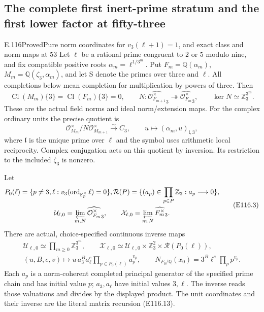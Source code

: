 \subsection{The complete first inert-prime stratum and the first lower factor at fifty-three}

\begin{statement}{E.116}{Proved}{Pure norm coordinates for $v_3(\ell+1)=1$, and exact class and norm maps at $53$}
Let $\ell$ be a rational prime congruent to $2$ or $5$ modulo nine,
and fix compatible positive roots $\alpha_m=\ell^{1/3^m}$.
Put $F_m=\mathbb Q(\alpha_m)$, $M_m=\mathbb Q(\zeta_3,\alpha_m)$,
and let S denote the primes over three and $\ell$.
All completions below mean completion for multiplication by powers of three.
Then
\[
 \operatorname{Cl}(M_m)\{3\}=\operatorname{Cl}(F_m)\{3\}=0,
 \qquad
 N:\widehat{\mathcal O_{F_{m+1}}^\times}_3
       \twoheadrightarrow\widehat{\mathcal O_{F_m}^\times}_3,
 \qquad \ker N\simeq\mathbb Z_3^{3^m}.
 \tag{E116.1}
\]
These are the actual field norms and ideal norm/extension maps.
For the complex ordinary units the precise quotient is
\[
 \mathcal O_{M_m}^\times/N\mathcal O_{M_{m+1}}^\times
       \xrightarrow{\sim}C_3,
 \qquad u\longmapsto(\alpha_m,u)_{\mathfrak l,3},
 \tag{E116.2}
\]
where $\mathfrak l$ is the unique prime over $\ell$ and
the symbol uses arithmetic local reciprocity. Complex
conjugation acts on this quotient by inversion. Its
restriction to the included $\zeta_3$ is nonzero.

Let
\[
 \begin{gathered}
 P_0(\ell)=\{p\ne3,\ell:v_3(\operatorname{ord}_{\mathbb F_p^\times}\ell)=0\},
 \mathcal R(P)=\{(a_p)\in\prod_{p\in P}\mathbb Z_3:
                       a_p\longrightarrow0\},\\
 \mathcal U_{\ell,0}=\varprojlim_{m,N}
              \widehat{\mathcal O_{F_m}^\times}_3,
 \qquad
 \mathcal X_{\ell,0}=\varprojlim_{m,N}\widehat{F_m^\times}_3.
 \end{gathered}
 \tag{E116.3}
\]
There are actual, choice-specified continuous inverse maps
\[
 \begin{gathered}
 \mathcal U_{\ell,0}\simeq\prod_{m\ge0}\mathbb Z_3^{3^m},\qquad
 \mathcal X_{\ell,0}\simeq
       \mathcal U_{\ell,0}\times\mathbb Z_3^2\times\mathcal R(P_0(\ell)),\\
 (u,B,e,v)\longmapsto u\,a_3^B a_\ell^e\prod_{p\in P_0(\ell)}a_p^{v_p},
 \qquad N_{F_0/\mathbb Q}(x_0)=3^B\ell^e\prod_p p^{v_p}.
 \end{gathered}
 \tag{E116.4}
\]
Each $a_p$ is a norm-coherent completed principal generator
of the specified prime chain and has initial value $p$;
$a_3,a_\ell$ have initial values $3,\ell$.
The inverse reads those valuations and divides by the displayed
product. The unit coordinates and their inverse are the
literal matrix recursion (E116.13).


\end{statement}
